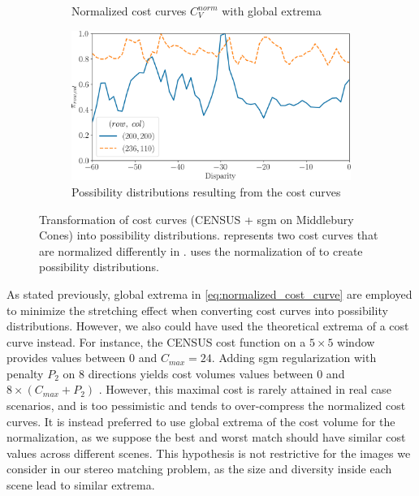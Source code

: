 \begin{figure}
\begin{subfigure}[t]{0.47\linewidth}
        \caption{Normalized cost curves $C_V^{norm}$ with global extrema}
        \label{fig:cost_curves_c}
    \end{subfigure}\hfill
    \begin{subfigure}[t]{0.47\linewidth}
        \centering
        \includegraphics[width=\linewidth]{Images/Chap_5/cost_curve_possibility_distribution.png}
        \caption{Possibility distributions resulting from the cost curves}
        \label{fig:cost_curves_d}
    \end{subfigure}\hfill
    \caption{Transformation of cost curves (CENSUS + \acrshort{sgm} on Middlebury Cones) into possibility distributions.  represents two cost curves that are normalized differently in .  uses the normalization of  to create possibility distributions.}
    \label{fig:cost_curves_to_possibility}
\end{figure}

As stated previously, global extrema in \cref{eq:normalized_cost_curve} are employed to minimize the stretching effect when converting cost curves into possibility distributions. However, we also could have used the theoretical extrema of a cost curve instead. For instance, the CENSUS cost function on a $5\times5$ window provides values between $0$ and $C_{max}=24$. Adding \acrshort{sgm} regularization with penalty $P_2$ on $8$ directions yields cost volumes values between $0$ and $8\times(C_{max}+P_2)$ \cite{hirschmuller_accurate_2005}. However, this maximal cost is rarely attained in real case scenarios, and is too pessimistic and tends to over-compress the normalized cost curves. It is instead preferred to use global extrema of the cost volume for the normalization, as we suppose the best and worst match should have similar cost values across different scenes. This hypothesis is not restrictive for the images we consider in our stereo matching problem, as the size and diversity inside each scene lead to similar extrema. 

